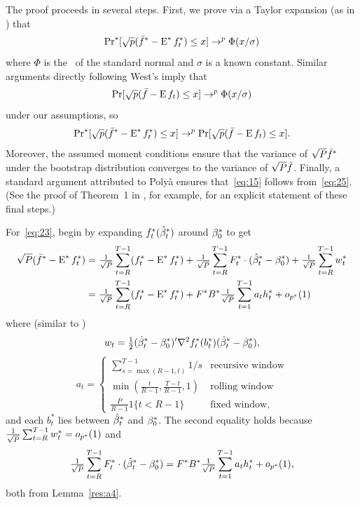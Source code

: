 \documentclass[12pt,fleqn]{article}
\begin{document}
The proof proceeds in several steps. First, we prove via a Taylor
expansion (as in \citealp{Wes:96}) that
\begin{equation}\label{eq:23}
  \operatorname{Pr}^*[\sqrt{p} (\bar f^* - \operatorname{E}^* f_t^*) \leq x] \to^p \Phi(x / \sigma)
\end{equation}
where $\Phi$ is the \cdf\ of the standard normal and $\sigma$ is a known
constant. Similar arguments directly following West's imply that
\begin{equation}\label{eq:24}
  \operatorname{Pr}[\sqrt{p} (\bar f - \operatorname{E} f_t) \leq x] \to^p \Phi(x / \sigma)
\end{equation}
under our assumptions, so
\begin{equation}\label{eq:25}
  \operatorname{Pr}^*[\sqrt{p} (\bar f^* - \operatorname{E}^* f_t^*) \leq x] \to^p
  \operatorname{Pr}[\sqrt{p} (\bar f - \operatorname{E} f_t) \leq x].
\end{equation}
Moreover, the assumed moment conditions ensure that the variance of
$\sqrt{P} \bar f^*$ under the bootstrap distribution converges to the
variance of $\sqrt{P} \bar f$. Finally, a standard argument attributed
to Poly{\`a} ensures that~\eqref{eq:15} follows
from~\eqref{eq:25}. (See the proof of Theorem~1 in \citealp{Cal:14},
for example, for an explicit statement of these final steps.)

For~\eqref{eq:23}, begin by expanding $f_t^{*}(\hat \beta_t^*)$ around
$\beta_0^*$ to get
  \begin{align*}
    \sqrt{P} (\bar f^* - \operatorname{E}^* f_t^*)
    &= \tfrac{1}{\sqrt{P}} \sum_{t=R}^{T-1} (f_t^{*} - \operatorname{E}^* f_t^*)
     + \tfrac{1}{\sqrt{P}} \sum_{t=R}^{T-1} F_t^* \cdot (\hat \beta_t^* - \beta_0^*)
     + \tfrac{1}{\sqrt{P}} \sum_{t=R}^{T-1} w_t^* \\
    &= \tfrac{1}{\sqrt{P}} \sum_{t=R}^{T-1} (f_t^{*} - \operatorname{E}^* f_t^*)
     + F^* B^* \tfrac{1}{\sqrt{P}} \sum_{t=1}^{T-1} a_t h_t^* + o_{p^*}(1)
  \end{align*}
  where (similar to \citealp{Wes:96})
  \begin{equation*}
    w_{t} = \tfrac12 (\hat \beta_t^* - \beta_0^*)' \nabla^2 f_{t}^*(b_{t}^*) (\hat \beta_t^* - \beta_0^*),
  \end{equation*}
  \begin{equation}\label{eq:1}
    a_t =
    \begin{cases}
      \sum_{s=\max(R-1, t)}^{T-1} 1/s & \text{recursive window} \\
      \min(\tfrac{t}{R-1}, \tfrac{T - t}{R-1}, 1) & \text{rolling window} \\
      \tfrac{P}{R-1} 1\{t < R-1\} &  \text{fixed window},
    \end{cases}
  \end{equation}
  and each $b_{t}^*$ lies between $\hat \beta_t^*$ and $\beta_0^*$. The second equality holds because
  $\tfrac{1}{\sqrt{P}} \sum_{t=R}^{T-1} w_t^* = o_{p^*}(1)$ and
  \begin{equation*}
    \tfrac{1}{\sqrt{P}} \sum_{t=R}^{T-1} F_t^* \cdot (\hat \beta_t^* - \beta_0^*)
    = F^* B^* \tfrac{1}{\sqrt{P}} \sum_{t=1}^{T-1} a_t h_t^* + o_{p^*}(1),
  \end{equation*}
  both from Lemma~\ref{res:a4}.
\end{document}
